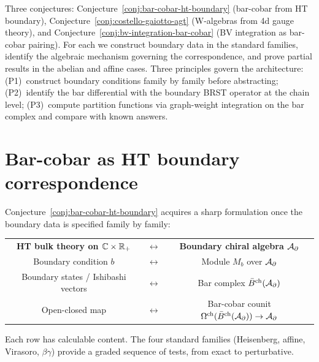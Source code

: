 \begin{summary}
Three conjectures: Conjecture~\ref{conj:bar-cobar-ht-boundary} (bar-cobar from HT
boundary), Conjecture~\ref{conj:costello-gaiotto-agt} (W-algebras from
4d gauge theory), and Conjecture~\ref{conj:bv-integration-bar-cobar}
(BV integration as bar-cobar pairing). For each we construct boundary data
in the standard families, identify the algebraic mechanism governing
the correspondence, and prove partial results in the
abelian and affine cases. Three principles govern the architecture:
(P1)~construct boundary conditions family by family before
abstracting; (P2)~identify the bar differential with the boundary BRST
operator at the chain level; (P3)~compute partition functions via
graph-weight integration on the bar complex and compare with known
answers.
\end{summary}


\section{Bar-cobar as HT boundary correspondence}

Conjecture~\ref{conj:bar-cobar-ht-boundary} acquires a sharp formulation once the boundary data is specified
family by family:

\begin{center}
\begin{tabular}{ccc}
\textbf{HT bulk theory on $\mathbb{C} \times \mathbb{R}_+$}
& $\longleftrightarrow$
& \textbf{Boundary chiral algebra $\mathcal{A}_\partial$} \\[4pt]
Boundary condition $b$
& $\longleftrightarrow$
& Module $M_b$ over $\mathcal{A}_\partial$ \\[4pt]
Boundary states / Ishibashi vectors
& $\longleftrightarrow$
& Bar complex $\bar{B}^{\mathrm{ch}}(\mathcal{A}_\partial)$ \\[4pt]
Open-closed map
& $\longleftrightarrow$
& Bar-cobar counit $\Omega^{\mathrm{ch}}(\bar{B}^{\mathrm{ch}}(\mathcal{A}_\partial)) \to \mathcal{A}_\partial$
\end{tabular}
\end{center}

\noindent
Each row has calculable content.
The four standard families (Heisenberg, affine, Virasoro, $\beta\gamma$)
provide a graded sequence of tests, from exact to perturbative.

